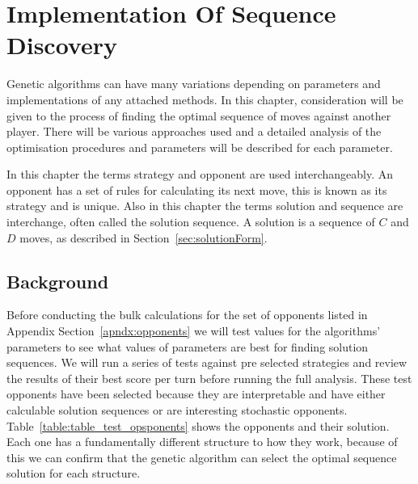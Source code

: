 \chapter{Implementation Of Sequence Discovery}\label{ch:implementation}
Genetic algorithms can have many variations depending on parameters and implementations of any attached methods. In this chapter, consideration will be given to the process of finding the optimal sequence of moves against another player.
There will be various approaches used and a detailed analysis of the optimisation procedures and parameters will be described for each parameter.

In this chapter the terms strategy and opponent are used interchangeably.
An opponent has a set of rules for calculating its next move, this is known as its strategy and is unique.
Also in this chapter the terms solution and sequence are interchange, often called the solution sequence.
A solution is a sequence of $C$ and $D$ moves, as described in Section~\ref{sec:solutionForm}.

\section{Background}
Before conducting the bulk calculations for the set of opponents listed in Appendix Section~\ref{apndx:opponents} we will test values for the algorithms' parameters to see what values of parameters are best for finding solution sequences.
We will run a series of tests against pre selected strategies and review the results of their best score per turn before running the full analysis.
These test opponents have been selected because they are interpretable and have either calculable solution sequences or are interesting stochastic opponents.
Table~\ref{table:table_test_opsponents} shows the opponents and their solution.
Each one has a fundamentally different structure to how they work, because of this we can confirm that the genetic algorithm can select the optimal sequence solution for each structure.


